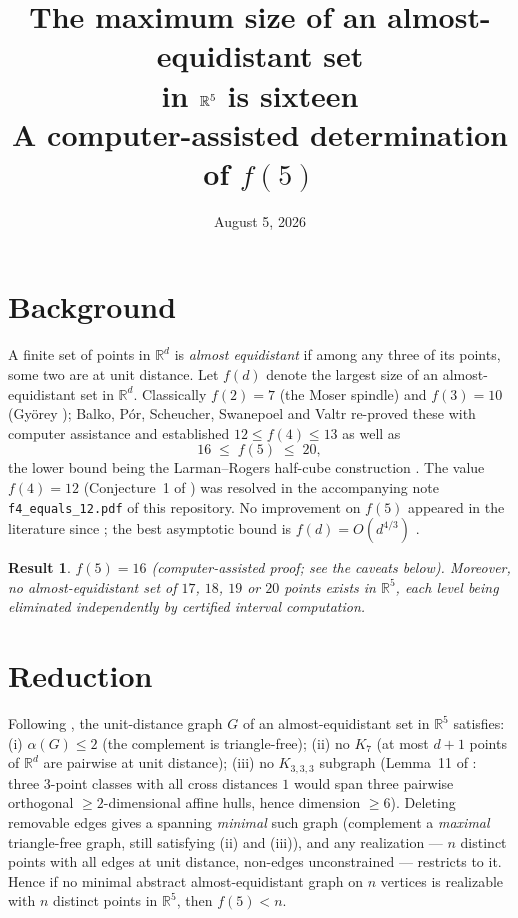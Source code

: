 \documentclass[11pt]{article}
\title{\vspace{-1.2cm}The maximum size of an almost-equidistant set\\
in $\R^5$ is sixteen\\[4pt]
\large A computer-assisted determination of $f(5)$}
\author{}
\date{August 5, 2026}
\newtheorem*{result}{Result}
\newcommand{\R}{\mathbb{R}}
\begin{document}
\maketitle
\vspace{-1.4cm}

\section*{Background}

A finite set of points in $\R^d$ is \emph{almost equidistant} if among any
three of its points, some two are at unit distance. Let $f(d)$ denote the
largest size of an almost-equidistant set in $\R^d$. Classically $f(2)=7$
(the Moser spindle) and $f(3)=10$ (Gy\"orey \cite{Gyorey}); Balko, P\'or,
Scheucher, Swanepoel and Valtr \cite{BPSSV} re-proved these with computer
assistance and established $12\le f(4)\le 13$ as well as
\[
  16\;\le\; f(5)\;\le\; 20 ,
\]
the lower bound being the Larman--Rogers half-cube construction \cite{LR}.
The value $f(4)=12$ (Conjecture~1 of \cite{BPSSV}) was resolved in the
accompanying note \texttt{f4\_equals\_12.pdf} of this repository. No
improvement on $f(5)$ appeared in the literature since \cite{BPSSV}; the
best asymptotic bound is $f(d)=O(d^{4/3})$ \cite{KMS}.

\begin{result}
$f(5)=16$ (computer-assisted proof; see the caveats below). Moreover, no
almost-equidistant set of $17$, $18$, $19$ or $20$ points exists in
$\R^5$, each level being eliminated independently by certified interval
computation.
\end{result}

\section*{Reduction}

Following \cite{BPSSV}, the unit-distance graph $G$ of an
almost-equidistant set in $\R^5$ satisfies: (i) $\alpha(G)\le2$ (the
complement is triangle-free); (ii) no $K_7$ (at most $d{+}1$ points of
$\R^d$ are pairwise at unit distance); (iii) no $K_{3,3,3}$ subgraph
(Lemma~11 of \cite{BPSSV}: three $3$-point classes with all cross
distances $1$ would span three pairwise orthogonal $\ge2$-dimensional
affine hulls, hence dimension $\ge6$). Deleting removable edges gives a
spanning \emph{minimal} such graph (complement a \emph{maximal}
triangle-free graph, still satisfying (ii) and (iii)), and any realization
--- $n$ distinct points with all edges at unit distance, non-edges
unconstrained --- restricts to it. Hence if no minimal abstract
almost-equidistant graph on $n$ vertices is realizable with $n$ distinct
points in $\R^5$, then $f(5)<n$.
\end{document}
